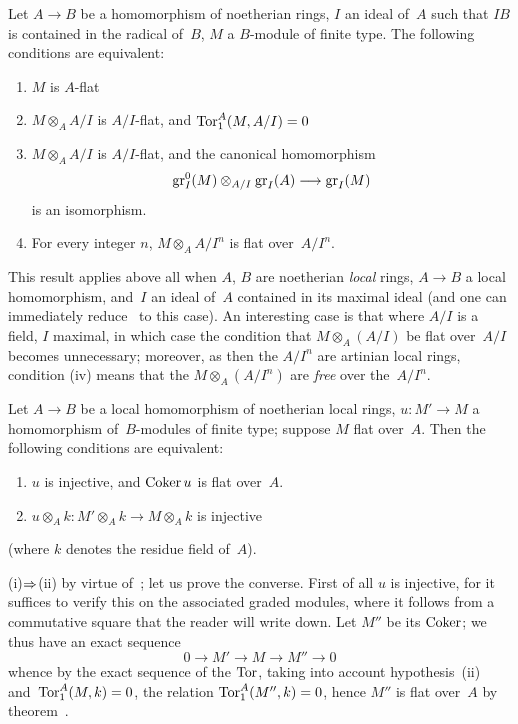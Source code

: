 \begin{theorem}
\label{IV.5.6}
Let $A\to B$ be a homomorphism of noetherian rings, $I$ an
ideal of~$A$ such that $IB$ is contained in the radical of~$B$, $M$
a $B$-module of finite type. The following conditions are
equivalent:
%
\begin{enumerate}
\item[(i)] $M$ is $A$-flat
\item[(ii)] $M\otimes_A A/I$ is $A/I$-flat, and $\operatorname{Tor}_1^A(M,A/I)=0$
\item[(iii)] $M\otimes_A A/I$ is $A/I$-flat, and the canonical
homomorphism
%
$$
\gr_I^0(M)\otimes_{A/I}\gr_I(A)\to\gr_I(M)
$$
%
is an isomorphism.
\item[(iv)] For every integer $n$, $M\otimes_A A/I^n$ is flat
over~$A/I^n$.
\end{enumerate}
\end{theorem}

This result applies above all when $A$, $B$ are noetherian
\emph{local} rings, $A\to B$ a local homomorphism, and~$I$
an ideal of~$A$ contained in its maximal ideal (and one can
immediately reduce~ to this case). An interesting
case is that where $A/I$ is a field, \ie $I$ maximal,
in which case the condition that $M\otimes_A(A/I)$ be flat over~$A/I$
becomes unnecessary; moreover, as then the $A/I^n$ are artinian
local rings, condition (iv) means that the
$M\otimes_A(A/I^n)$ are \emph{free} over the~$A/I^n$.

\begin{corollary}
\label{IV.5.7}
Let
$A\to B$ be a local homomorphism of noetherian local rings,
$u\colon M'\to M$ a homomorphism of~$B$-modules of finite type;
suppose $M$ flat over~$A$. Then the following conditions are
equivalent:
%
\begin{enumerate}
\item[(i)] $u$ is injective, and $\operatorname{Coker} u$ is flat over~$A$.
\item[(ii)] $u\otimes_A k\colon M'\otimes_A k\to M\otimes_A k$ is
injective
\end{enumerate}
%
(where $k$ denotes the residue field of~$A$).
\end{corollary}

(i)$\To$(ii) by virtue of~; let us prove the
converse. First of all $u$ is injective, for it suffices to
verify this on the associated graded modules, where it follows from
a commutative square that the reader will write down. Let $M''$ be its
$\operatorname{Coker}$; we thus have an exact sequence
%
$$
0\to M'\to M\to M''\to 0
$$
%
whence by the exact sequence of the $\operatorname{Tor}$, taking into account
hypothesis~(ii) and~$\operatorname{Tor}_1^A(M,k)=0$, the relation
$\operatorname{Tor}_1^A(M'',k)=0$, hence $M''$ is flat over~$A$ by
theorem~.

